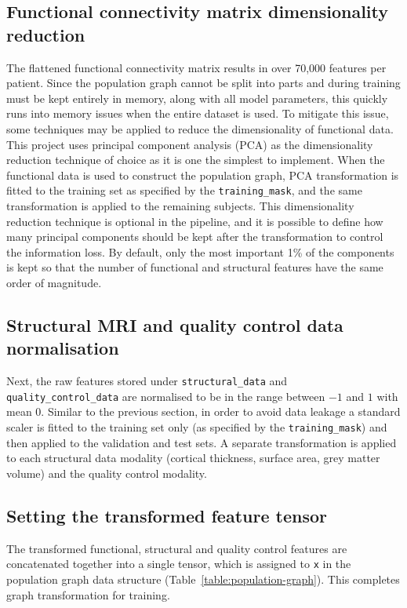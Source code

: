 \subsection{Functional connectivity matrix dimensionality reduction}
The flattened functional connectivity matrix results in over 70,000 features per patient. Since the population graph cannot be split into parts and during training must be kept entirely in memory, along with all model parameters, this quickly runs into memory issues when the entire dataset is used. To mitigate this issue, some techniques may be applied to reduce the dimensionality of functional data. This project uses principal component analysis (PCA) as the dimensionality reduction technique of choice as it is one the simplest to implement. When the functional data is used to construct the population graph, PCA transformation is fitted to the training set as specified by the \texttt{training\_mask}, and the same transformation is applied to the remaining subjects. This dimensionality reduction technique is optional in the pipeline, and it is possible to define how many principal components should be kept after the transformation to control the information loss. By default, only the most important 1\% of the components is kept so that the number of functional and structural features have the same order of magnitude.

\subsection{Structural MRI and quality control data normalisation}
Next, the raw features stored under \texttt{structural\_data} and \texttt{quality\_control\_data} are normalised to be in the range between $-1$ and $1$ with mean 0. Similar to the previous section, in order to avoid data leakage a standard scaler is fitted to the training set only (as specified by the \texttt{training\_mask}) and then applied to the validation and test sets. A separate transformation is applied to each structural data modality (cortical thickness, surface area, grey matter volume) and the quality control modality.

\subsection{Setting the transformed feature tensor}
The transformed functional, structural and quality control features are concatenated together into a single tensor, which is assigned to \texttt{x} in the population graph data structure (Table~\ref{table:population-graph}). This completes graph transformation for training.

